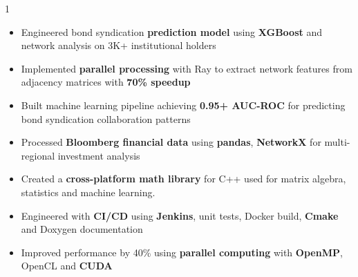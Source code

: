 \documentclass[11pt,a4paper,ragged2e]{altacv}
\begin{document}
\begin{paracol}{1}
\begin{itemize}
    \item Engineered bond syndication \textbf{prediction model} using \textbf{XGBoost} and network analysis on 3K+ institutional holders
    \item Implemented \textbf{parallel processing} with Ray to extract network features from adjacency matrices with \textbf{70\% speedup}
      \item Built machine learning pipeline achieving \textbf{0.95+ AUC-ROC} for predicting bond syndication collaboration patterns
    \item Processed \textbf{Bloomberg financial data} using \textbf{pandas}, \textbf{NetworkX} for multi-regional investment analysis
\end{itemize}
\tightdivider

\begin{itemize}
\item Created a \textbf{cross-platform math library} for C++ used for matrix algebra, statistics and machine learning.
\item Engineered with \textbf{CI/CD} using \textbf{Jenkins}, unit tests, Docker build, \textbf{Cmake} and Doxygen documentation
\item Improved performance by 40\% using \textbf{parallel computing} with \textbf{OpenMP}, OpenCL and \textbf{CUDA}
\end{itemize}






\end{paracol}
\end{document}
